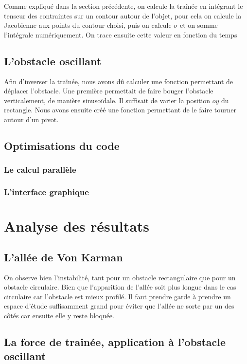 		Comme expliqué dans la section précédente, on calcule la traînée en intégrant le tenseur des contraintes sur un contour autour de l'objet, pour cela on calcule la Jacobienne aux points du contour choisi, puis on calcule $\sigma$ et on somme l'intégrale numériquement. On trace ensuite cette valeur en fonction du temps
		
		
	\subsection{L'obstacle oscillant}
		
		 Afin d'inverser la traînée, nous avons dû calculer une fonction permettant de déplacer l'obstacle. Une première permettait de faire bouger l'obstacle verticalement, de manière sinusoïdale. Il suffisait de varier la position $oy$ du rectangle. Nous avons ensuite créé une fonction permettant de le faire tourner autour d'un pivot.
		 
	\subsection{Optimisations du code}
		
		\subsubsection{Le calcul parallèle}
		
		\subsubsection{L'interface graphique}
		 
\section{Analyse des résultats}

	\subsection{L'allée de Von Karman}
	
		On observe bien l'instabilité, tant pour un obstacle rectangulaire que pour un obstacle circulaire. Bien que l'apparition de l'allée soit plus longue dans le cas circulaire car l'obstacle est mieux profilé. Il faut prendre garde à prendre un espace d'étude suffisamment grand pour éviter que l'allée ne sorte par un des côtés car ensuite elle y reste bloquée.
	
	\subsection{La force de trainée, application à l'obstacle oscillant}
	
